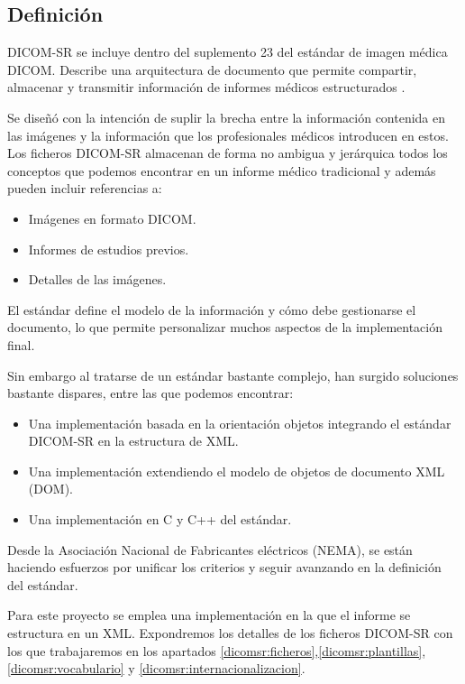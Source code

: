 \subsection{Definición}
DICOM-SR se incluye dentro del suplemento 23 del estándar de imagen médica DICOM. Describe una arquitectura de documento que permite compartir, almacenar y transmitir información de informes médicos estructurados \cite{hussein2004dicom}.\par
Se diseñó con la intención de suplir la brecha entre la información contenida en las imágenes y la información que los profesionales médicos introducen en estos. Los ficheros DICOM-SR almacenan de forma no ambigua y jerárquica todos los conceptos que podemos encontrar en un informe médico tradicional y además pueden incluir referencias a:
\begin{itemize}
	\item Imágenes en formato DICOM. 
	\item Informes de estudios previos.
	\item Detalles de las imágenes.
\end{itemize}\par\medskip\par
El estándar define el modelo de la información y cómo debe gestionarse el documento, lo que permite personalizar muchos aspectos de la implementación final\cite{hussein2004dicom2}.\par
Sin embargo al tratarse de un estándar bastante complejo, han surgido soluciones bastante dispares, entre las que podemos encontrar:
\begin{itemize}
	\item Una implementación basada en la orientación objetos integrando el estándar DICOM-SR en la estructura de XML.\cite{tirado2002information}
	\item Una implementación extendiendo el modelo de objetos de documento XML (DOM).\cite{doi:10.1117}
	\item Una implementación en C y C++ del estándar. \cite{Riesmeier2001795}
\end{itemize}
\par
Desde la Asociación Nacional de Fabricantes eléctricos (NEMA), se están haciendo esfuerzos por unificar los criterios y seguir avanzando en la definición del estándar.\par
Para este proyecto se emplea una implementación en la que el informe se estructura en un XML. Expondremos los detalles de los ficheros DICOM-SR con los que trabajaremos en los apartados \ref{dicomsr:ficheros},\ref{dicomsr:plantillas}, \ref{dicomsr:vocabulario} y \ref{dicomsr:internacionalizacion}.\par

